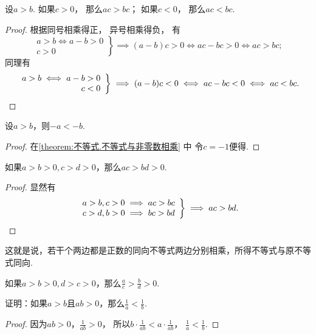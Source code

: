 \begin{theorem}\label{theorem:不等式.不等式与非零数相乘}
设\(a>b\).
如果\(c>0\)，
那么\(ac>bc\)；
如果\(c<0\)，
那么\(ac<bc\).
\begin{proof}
根据同号相乘得正，
异号相乘得负，
有\[
	\left. \begin{array}{r}
		a>b \iff a-b>0 \\
		c>0
	\end{array} \right\}
	\implies (a-b)c>0
	\iff ac-bc>0
	\iff ac>bc;
\]
同理有\[
	\left. \begin{array}{r}
		a>b \iff a-b> 0 \\
		c<0
	\end{array} \right\}
	\implies (a-b)c<0
	\iff ac-bc<0
	\iff ac<bc.
	\qedhere
\]
\end{proof}
\end{theorem}

\begin{corollary}\label{theorem:不等式.不等式与负一相乘}
设\(a>b\)，则\(-a<-b\).
\begin{proof}
在\cref{theorem:不等式.不等式与非零数相乘} 中
令\(c = -1\)便得.
\end{proof}
\end{corollary}

\begin{corollary}\label{theorem:不等式.同向不等式相乘}
如果\(a>b>0,c>d>0\)，那么\(ac>bd>0\).
\begin{proof}
显然有\[
	\left. \begin{array}{r}
		a>b,c>0 \implies ac>bc \\
		c>d,b>0 \implies bc>bd
	\end{array} \right\}
	\implies ac>bd.
	\qedhere
\]
\end{proof}
\end{corollary}
这就是说，若干个两边都是正数的同向不等式两边分别相乘，所得不等式与原不等式同向.

\begin{corollary}
如果\(a>b>0,d>c>0\)，那么\(\frac{a}{c}>\frac{b}{d}>0\).
\end{corollary}

\begin{example}
证明：如果\(a > b\)且\(ab > 0\)，那么\(\frac1a < \frac1b\).
\begin{proof}
因为\(ab > 0\)，\(\frac1{ab} > 0\)，
所以\(b \cdot \frac1{ab} < a \cdot \frac1{ab}\)，
\(\frac1a < \frac1b\).
\end{proof}
\end{example}

